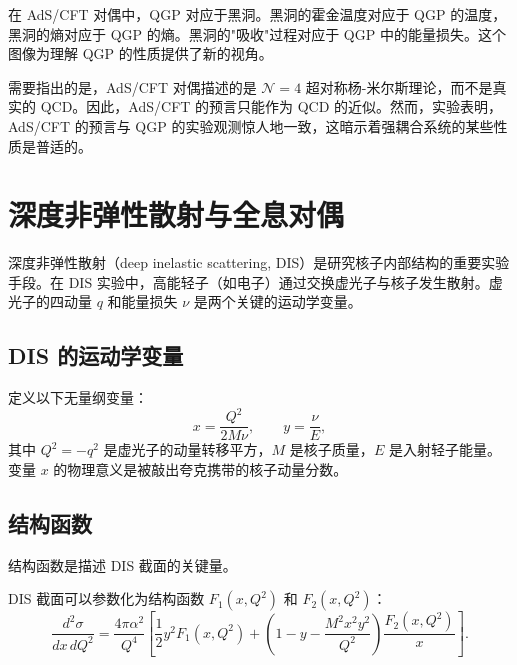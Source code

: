 \begin{remark}
在 AdS/CFT 对偶中，QGP 对应于黑洞。黑洞的霍金温度对应于 QGP 的温度，黑洞的熵对应于 QGP 的熵。黑洞的"吸收"过程对应于 QGP 中的能量损失。这个图像为理解 QGP 的性质提供了新的视角。
\end{remark}

\begin{remark}
需要指出的是，AdS/CFT 对偶描述的是 $\mathcal{N}=4$ 超对称杨-米尔斯理论，而不是真实的 QCD。因此，AdS/CFT 的预言只能作为 QCD 的近似。然而，实验表明，AdS/CFT 的预言与 QGP 的实验观测惊人地一致，这暗示着强耦合系统的某些性质是普适的。
\end{remark}

\section{深度非弹性散射与全息对偶}

深度非弹性散射（deep inelastic scattering, DIS）是研究核子内部结构的重要实验手段。在 DIS 实验中，高能轻子（如电子）通过交换虚光子与核子发生散射。虚光子的四动量 $q$ 和能量损失 $\nu$ 是两个关键的运动学变量。

\subsection{DIS 的运动学变量}

\begin{definition}
定义以下无量纲变量：
\begin{equation}
    x = \frac{Q^2}{2M\nu}, \qquad y = \frac{\nu}{E},
\end{equation}
其中 $Q^2 = -q^2$ 是虚光子的动量转移平方，$M$ 是核子质量，$E$ 是入射轻子能量。变量 $x$ 的物理意义是被敲出夸克携带的核子动量分数。
\end{definition}

\subsection{结构函数}

结构函数是描述 DIS 截面的关键量。

\begin{definition}[结构函数]
DIS 截面可以参数化为结构函数 $F_1(x, Q^2)$ 和 $F_2(x, Q^2)$：
\begin{equation}
    \frac{d^2\sigma}{dx \, dQ^2} = \frac{4\pi \alpha^2}{Q^4} \left[ \frac{1}{2} y^2 F_1(x, Q^2) + \left(1 - y - \frac{M^2 x^2 y^2}{Q^2}\right) \frac{F_2(x, Q^2)}{x} \right].
\end{equation}
\end{definition}

